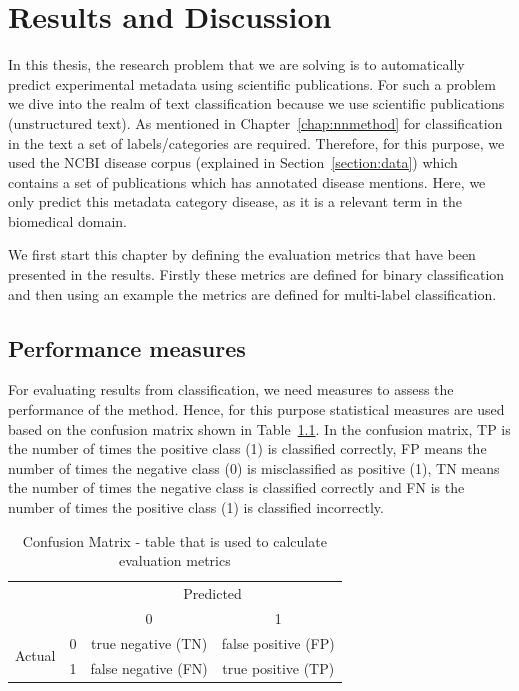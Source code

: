 \chapter{Results and Discussion}\label{chap: results}

In this thesis, the research problem that we are solving is to automatically predict experimental metadata using scientific publications. For such a problem we dive into the realm of text classification because we use scientific publications (unstructured text). As mentioned in Chapter~\ref{chap:nnmethod} for classification in the text a set of labels/categories are required. Therefore, for this purpose, we used the NCBI disease corpus (explained in Section~\ref{section:data}) which contains a set of publications which has annotated disease mentions. Here, we only predict this metadata category disease, as it is a relevant term in the biomedical domain. 

We first start this chapter by defining the evaluation metrics that have been presented in the results. Firstly these metrics are defined for binary classification and then using an example the metrics are defined for multi-label classification. 

\section*{Performance measures}
For evaluating results from classification, we need measures to assess the performance of the method. Hence, for this purpose statistical measures are used based on the confusion matrix shown in Table~\ref{tab:confusionmatrix}. In the confusion matrix, TP is the number of times the positive class (1) is classified correctly, FP means the number of times the negative class (0) is misclassified as positive (1), TN means the number of times the negative class is classified correctly and FN is the number of times the positive class (1) is classified incorrectly. 

\begin{table}[!htb]
    \centering
    \begin{tabular}{|c|c|c|c|}
\hline
\multicolumn{2}{|c|}{\multirow{2}{*}{}} & \multicolumn{2}{c|}{Predicted} \\ \cline{3-4} 
\multicolumn{2}{|c|}{} & 0 & 1 \\ \hline
\multirow{2}{*}{Actual} & 0 & true negative (TN) & false positive (FP) \\ \cline{2-4} 
 & 1 & false negative (FN) & true positive (TP) \\ \hline
\end{tabular}
    \caption{Confusion Matrix - table that is used to calculate evaluation metrics}
    \label{tab:confusionmatrix}
\end{table}

